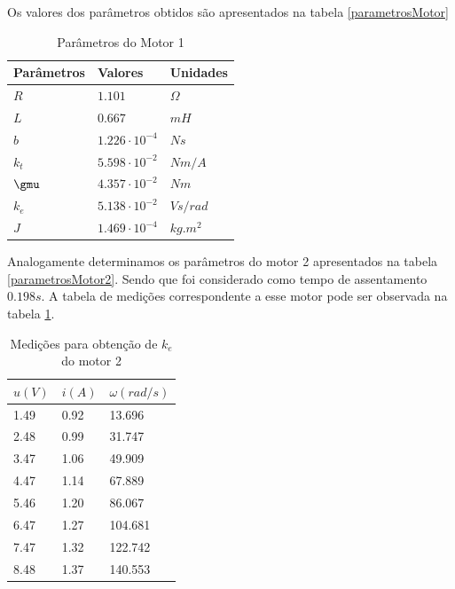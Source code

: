 \documentclass[]{politex}
\newcommand{\tabtag}[1]{%
\renewcommand{\thetable}{\ref{#1}}%
\addtocounter{table}{-1}}
\begin{document}
Os valores dos parâmetros obtidos são apresentados na tabela \ref{parametrosMotor}

\begin{table}[H]
\centering
\tabtag{parametrosMotor}
\caption{Parâmetros do Motor 1}
\begin{tabular}{l|l|l}
Parâmetros  & Valores               & Unidades   \\ \hline
$R$         & $1.101$               & $\Omega$   \\
$L$         & $0.667$               & $mH$       \\
$b$         & $1.226 \cdot 10^{-4}$ & $N s$      \\
$k_{t}$     & $5.598 \cdot 10^{-2}$ & $Nm/A$     \\
$\gmu$      & $4.357 \cdot 10^{-2}$ & $Nm$       \\
$k_{e}$     & $5.138 \cdot 10^{-2}$ & $V s/rad$  \\
$J$         & $1.469 \cdot 10^{-4}$ & $kg.m^{2}$
\end{tabular}
\end{table}

Analogamente determinamos os parâmetros do motor 2 apresentados na tabela \ref{parametrosMotor2}. Sendo que foi considerado como tempo de assentamento $0.198 s$. A tabela de medições correspondente a esse motor pode ser observada na tabela \ref{MMQke2}.

\begin{table}[H]
\centering
\caption{Medições para obtenção de $k_{e}$ do motor 2}
\label{MMQke2}
\begin{tabular}{l|l|l}
$u(V)$     & $i(A)$    & $\omega(rad/s)$       \\ \hline
1.49  & 0.92 & 13.696  \\
2.48  & 0.99 & 31.747  \\
3.47  & 1.06 & 49.909  \\
4.47  & 1.14 & 67.889  \\
5.46  & 1.20 & 86.067  \\
6.47  & 1.27 & 104.681 \\
7.47  & 1.32 & 122.742 \\
8.48  & 1.37 & 140.553
\end{tabular}
\end{table}
\end{document}
